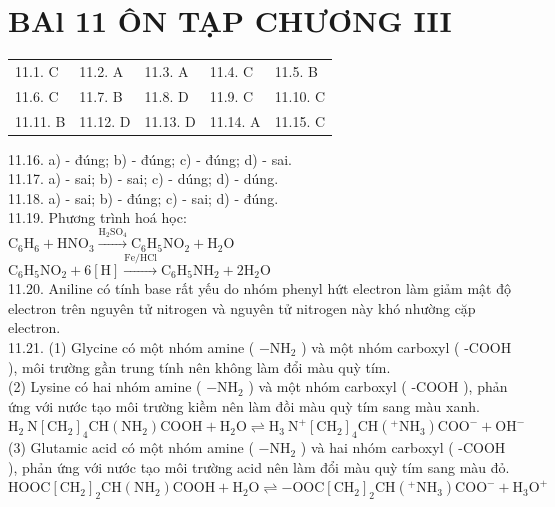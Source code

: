 \documentclass[10pt]{article}
\begin{document}
\section*{BAl 11 ÔN TẠP CHƯƠNG III}
\begin{center}
\begin{tabular}{lllll}
11.1. C & 11.2. A & 11.3. A & 11.4. C & 11.5. B \\
11.6. C & 11.7. B & 11.8. D & 11.9. C & 11.10. C \\
11.11. B & 11.12. D & 11.13. D & 11.14. A & 11.15. C \\
\end{tabular}
\end{center}

11.16. a) - đúng; b) - đúng; c) - đúng; d) - sai.\\
11.17. a) - sai; b) - sai; c) - dúng; d) - dúng.\\
11.18. a) - sai; b) - đúng; c) - sai; d) - đúng.\\
11.19. Phương trình hoá học:\\
$\mathrm{C}_{6} \mathrm{H}_{6}+\mathrm{HNO}_{3} \xrightarrow{\mathrm{H}_{2} \mathrm{SO}_{4}} \mathrm{C}_{6} \mathrm{H}_{5} \mathrm{NO}_{2}+\mathrm{H}_{2} \mathrm{O}$\\
$\mathrm{C}_{6} \mathrm{H}_{5} \mathrm{NO}_{2}+6[\mathrm{H}] \xrightarrow{\mathrm{Fe} / \mathrm{HCl}} \mathrm{C}_{6} \mathrm{H}_{5} \mathrm{NH}_{2}+2 \mathrm{H}_{2} \mathrm{O}$\\
11.20. Aniline có tính base rất yếu do nhóm phenyl hứt electron làm giảm mật độ electron trên nguyên tử nitrogen và nguyên tử nitrogen này khó nhường cặp electron.\\
11.21. (1) Glycine có một nhóm amine ( $-\mathrm{NH}_{2}$ ) và một nhóm carboxyl ( -COOH ), môi trường gần trung tính nên không làm đổi màu quỳ tím.\\
(2) Lysine có hai nhóm amine ( $-\mathrm{NH}_{2}$ ) và một nhóm carboxyl ( -COOH ), phản ứng với nước tạo môi trường kiềm nên làm đồi màu quỳ tím sang màu xanh.\\
$\mathrm{H}_{2} \mathrm{~N}\left[\mathrm{CH}_{2}\right]_{4} \mathrm{CH}\left(\mathrm{NH}_{2}\right) \mathrm{COOH}+\mathrm{H}_{2} \mathrm{O} \rightleftharpoons \mathrm{H}_{3} \mathrm{~N}^{+}\left[\mathrm{CH}_{2}\right]_{4} \mathrm{CH}\left({ }^{+} \mathrm{NH}_{3}\right) \mathrm{COO}^{-}+\mathrm{OH}^{-}$\\
(3) Glutamic acid có một nhóm amine ( $-\mathrm{NH}_{2}$ ) và hai nhóm carboxyl ( -COOH ), phản ứng với nước tạo môi trường acid nên làm đổi màu quỳ tím sang màu đỏ.\\
$\mathrm{HOOC}\left[\mathrm{CH}_{2}\right]_{2} \mathrm{CH}\left(\mathrm{NH}_{2}\right) \mathrm{COOH}+\mathrm{H}_{2} \mathrm{O} \rightleftharpoons-\mathrm{OOC}\left[\mathrm{CH}_{2}\right]_{2} \mathrm{CH}\left({ }^{+} \mathrm{NH}_{3}\right) \mathrm{COO}^{-}+\mathrm{H}_{3} \mathrm{O}^{+}$
\end{document}
